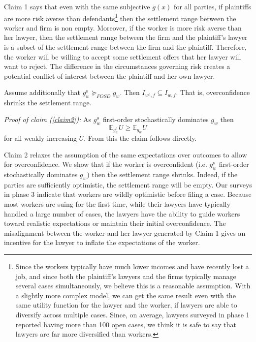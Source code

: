 Claim 1 says that even with the same subjective $g(x)$ for all parties, if plaintiffs are more risk averse than defendants\footnote{Since the workers typically have much lower incomes and have recently lost a job, and since both the plaintiff's lawyers and the firms typically manage several cases simultaneously, we believe this is a reasonable assumption. With a slightly more complex model, we can get the same result even with the same utility function for the lawyer and the worker, if lawyers are able to diversify across multiple cases. Since, on average, lawyers surveyed in phase 1 reported having more than 100 open cases, we think it is safe to say that lawyers are far more diversified than workers.} then the settlement range between the worker and firm is non empty. Moreover, if the worker is more risk averse than her lawyer, then the settlement range between the firm and the plaintiff's lawyer is a subset of the settlement range between the firm and the plaintiff. Therefore, the worker will be willing to accept some settlement offers that her lawyer will want to reject. The difference in the circumstances governing risk creates a potential conflict of interest between the plaintiff and her own lawyer. 

\begin{claim}
\label{claim2}
Assume additionally that $g^o_w \succeq_{FOSD} g_w$. Then $I_{w^o,f} \subseteq I_{w,f}$. That is, overconfidence shrinks the settlement range.
\end{claim}

\textit{Proof of claim (\ref{claim2}):}
As $g^o_w$ first-order stochastically dominates $g_w$ then 
\[\mathbb{E}_{g^o_w}U\geq \mathbb{E}_{g_w}U\]
for all weakly increasing $U$. From this the claim follows directly.


Claim 2 relaxes the assumption of the same expectations over outcomes to allow for overconfidence. We show that if the worker is overconfident (i.e. $g_w^o$ first-order stochastically  dominates $g_w$) then the settlement range shrinks. Indeed, if the parties are sufficiently optimistic, the settlement range will be empty. Our surveys in phase 3 indicate that workers are wildly optimistic before filing a case. Because most workers are suing for the first time, while their lawyers have typically handled a large number of cases, the lawyers have the ability to guide workers toward realistic expectations or maintain their initial overconfidence. The misalignment between the worker and her lawyer generated by Claim 1 gives an incentive for the lawyer to inflate the expectations of the worker. 

